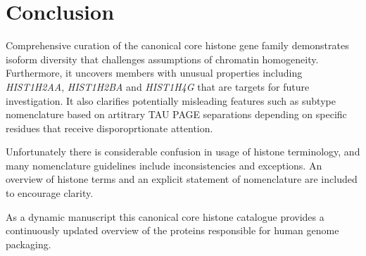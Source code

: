 \section{Conclusion}

	Comprehensive curation of the canonical core histone gene family 
	demonstrates isoform diversity that challenges assumptions of chromatin homogeneity.
	Furthermore, it uncovers members with unusual properties 
	including \textit{HIST1H2AA}, \textit{HIST1H2BA} and \textit{HIST1H4G}
	that are targets for future investigation.
	It also clarifies potentially misleading features such as subtype nomenclature 
	based on artitrary TAU PAGE separations depending on specific residues 
	that receive disporoprtionate attention.

	Unfortunately there is considerable confusion in usage of histone terminology,
	and many nomenclature guidelines include inconsistencies and exceptions.
	An overview of histone terms and an explicit statement of nomenclature 
	are included to encourage clarity.

	As a dynamic manuscript this canonical core histone catalogue 
	provides a continuously updated overview of the proteins 
	responsible for human genome packaging.